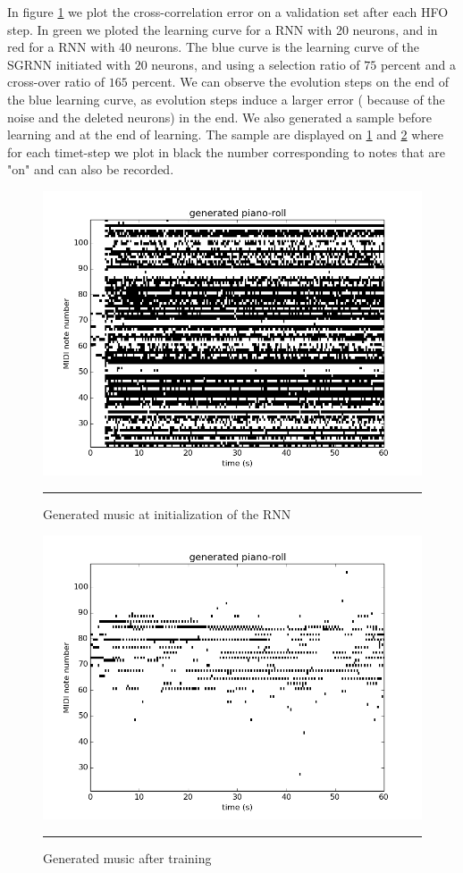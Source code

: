 In figure \ref{fig:init_roll} we plot the cross-correlation error on a validation set after each HFO step. In green we ploted the learning curve for a RNN with 20 neurons, and in red for a RNN with 40 neurons. The blue curve is the learning curve of the SGRNN initiated with $20$ neurons, and using a selection ratio of $75$ percent and a cross-over ratio of $165$ percent. We can observe the evolution steps on the end of the blue learning curve, as evolution steps induce a larger error ( because of the noise and the deleted neurons) in the end. We also generated a sample before learning and at the end of learning. The sample are displayed on \ref{fig:init_roll} and \ref{fig:piano_roll} where for each timet-step we plot in black the number corresponding to notes that are "on" and can also be recorded.


    
\begin{figure}[htbp]
    \centering
\includegraphics[scale=0.5]{Figures/init_piano_roll.png}
    \rule{35em}{0.5pt}
    \caption[Generated music at initialization of the RNN]{Generated music at initialization of the RNN}
    \label{fig:init_roll}
\end{figure}


\begin{figure}[htbp]
    \centering
    \includegraphics[scale=0.5]{Figures/piano_roll.png}
    \rule{35em}{0.5pt}
    \caption[Generated music after training]{Generated music after training}
    \label{fig:piano_roll}
\end{figure}


